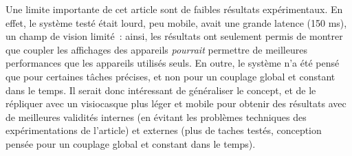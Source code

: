 Une limite importante de cet article sont de faibles résultats expérimentaux. En effet, le système testé était lourd, peu mobile, avait une grande latence (150 ms), un champ de vision limité~: ainsi, les résultats ont seulement permis de montrer que coupler les affichages des appareils \emph{pourrait} permettre de meilleures performances que les appareils utilisés seuls. En outre, le système n'a été pensé que pour certaines tâches précises, et non pour un couplage global et constant dans le temps. Il serait donc intéressant de généraliser le concept, et de le répliquer avec un visiocasque plus léger et mobile pour obtenir des résultats avec de meilleures validités internes (en évitant les problèmes techniques des expérimentations de l'article) et externes (plus de taches testés, conception pensée pour un couplage global et constant dans le temps).


